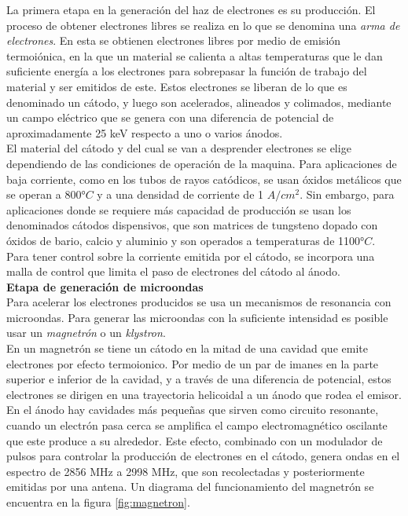 La primera etapa en la generación del haz de electrones es su producción. El proceso de obtener electrones libres se realiza en lo que se denomina una \textit{arma de electrones}. En esta se obtienen electrones libres por medio de emisión termoiónica, en la que un material se calienta a altas temperaturas que le dan suficiente energía a los electrones para sobrepasar la función de trabajo del material y ser emitidos de este. Estos electrones se liberan de lo que es denominado un cátodo, y luego son acelerados, alineados y colimados, mediante un campo eléctrico que se genera con una diferencia de potencial de aproximadamente 25 keV respecto a uno o varios ánodos.\\

El material del cátodo y del cual se van a desprender electrones se elige dependiendo de las condiciones de operación de la maquina. Para aplicaciones de baja corriente, como en los tubos de rayos catódicos, se usan óxidos metálicos que se operan a 800°$C$ y a una densidad de corriente de 1 $A/cm^2$. Sin embargo, para aplicaciones donde se requiere más capacidad de producción se usan los denominados cátodos dispensivos, que son matrices de tungsteno dopado con óxidos de bario, calcio y aluminio y son operados a temperaturas de 1100°$C$.\\ 

Para tener control sobre la corriente emitida por el cátodo, se incorpora una malla de control que limita el paso de electrones del cátodo al ánodo.\\

\textbf{Etapa de generación de microondas}\\

Para acelerar los electrones producidos se usa un mecanismos de resonancia con microondas. Para generar las microondas con la suficiente intensidad es posible usar un \textit{magnetrón} o un \textit{klystron}.\\

En un magnetrón se tiene un cátodo en la mitad de una cavidad que emite electrones por efecto termoionico. Por medio de un par de imanes en la parte superior e inferior de la cavidad, y a través de una diferencia de potencial, estos electrones se dirigen en una trayectoria helicoidal a un ánodo que rodea el emisor. En el ánodo hay cavidades más pequeñas que sirven como circuito resonante, cuando un electrón pasa cerca se amplifica el campo electromagnético oscilante que este produce a su alrededor. Este efecto, combinado con un modulador de pulsos para controlar la producción de electrones en el cátodo, genera ondas en el espectro de 2856 MHz a 2998 MHz, que son recolectadas y posteriormente emitidas por una antena. Un diagrama del funcionamiento del magnetrón se encuentra en la figura \ref{fig:magnetron}.\\

